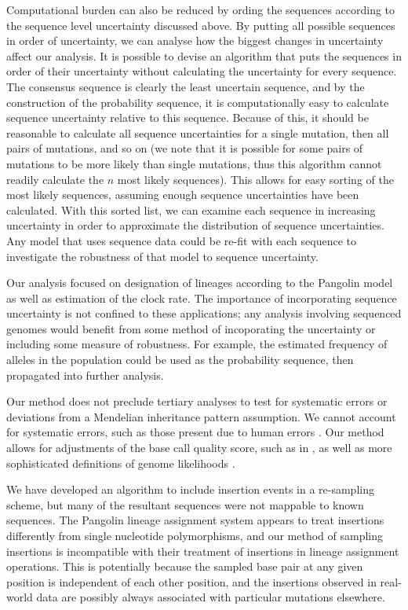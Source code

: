 \documentclass[10pt]{article}
\begin{document}
Computational burden can also be reduced by ording the sequences according to the sequence level uncertainty discussed above.
By putting all possible sequences in order of uncertainty, we can analyse how the biggest changes in uncertainty affect our analysis.
It is possible to devise an algorithm that puts the sequences in order of their uncertainty without calculating the uncertainty for every sequence.
The consensus sequence is clearly the least uncertain sequence, and by the construction of the probability sequence, it is computationally easy to calculate sequence uncertainty relative to this sequence.
Because of this, it should be reasonable to calculate all sequence uncertainties for a single mutation, then all pairs of mutations, and so on (we note that it is possible for some pairs of mutations to be more likely than single mutations, thus this algorithm cannot readily calculate the $n$ most likely sequences).
This allows for easy sorting of the most likely sequences, assuming enough sequence uncertainties have been calculated.
With this sorted list, we can examine each sequence in increasing uncertainty in order to approximate the distribution of sequence uncertainties.
Any model that uses sequence data could be re-fit with each sequence to investigate the robustness of that model to sequence uncertainty.

Our analysis focused on designation of lineages according to the Pangolin model as well as estimation of the clock rate.
The importance of incorporating sequence uncertainty is not confined to these applications; any analysis involving sequenced genomes would benefit from some method of incoporating the uncertainty or including some measure of robustness.
For example, the estimated frequency of alleles in the population could be used as the probability sequence, then propagated into further analysis.

Our method does not preclude tertiary analyses to test for systematic errors or deviations from a Mendelian inheritance pattern assumption.
We cannot account for systematic errors, such as those present due to human errors \citep[\eg as noted in][]{IssuesSARSCoV2Sequencing2020}. 
Our method allows for adjustments of the base call quality score, such as in \citet{brockmanQualityScoresSNP2008}, as well as more sophisticated definitions of genome likelihoods \citep[\eg ][]{liAdjustQualityScores2004, depristoFrameworkVariationDiscovery2011, liSNPDetectionMassively2009}.

We have developed an algorithm to include insertion events in a re-sampling scheme, but many of the resultant sequences were not mappable to known sequences.
The Pangolin lineage assignment system appears to treat insertions differently from single nucleotide polymorphisms, and our method of sampling insertions is incompatible with their treatment of insertions in lineage assignment operations.
This is potentially because the sampled base pair at any given position is independent of each other position, and the insertions observed in real-world data are possibly always associated with particular mutations elsewhere.
\end{document}
